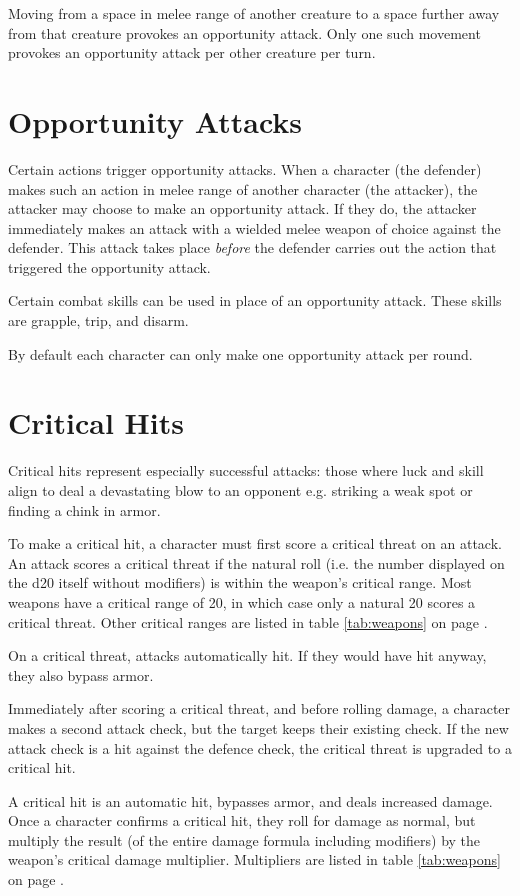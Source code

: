 \begin{multicols*}{2}
    Moving from a space in melee range of another creature to a space further
    away from that creature provokes an opportunity attack. Only one such
    movement provokes an opportunity attack per other creature per turn.

    \section{Opportunity Attacks}\label{combat:opportunity-attacks}
    Certain actions trigger opportunity attacks. When a character (the
    defender) makes such an action in melee range of another character (the
    attacker), the attacker may choose to make an opportunity attack. If they
    do, the attacker immediately makes an attack with a wielded melee weapon
    of choice against the defender. This attack takes place \textit{before}
    the defender carries out the action that triggered the opportunity attack.

    Certain combat skills can be used in place of an opportunity attack. These
    skills are grapple, trip, and disarm.

    By default each character can only make one opportunity attack per round.

    \section{Critical Hits}\label{combat:critical-hits}
    Critical hits represent especially successful attacks: those where luck and
    skill align to deal a devastating blow to an opponent e.g. striking a weak
    spot or finding a chink in armor.

    To make a critical hit, a character must first score a critical
    threat on an attack. An attack scores a critical
    threat if the natural roll (i.e. the number displayed on the d20 itself
    without modifiers) is within the weapon's critical range. Most weapons
    have a critical range of 20, in which case only a natural 20 scores a
    critical threat. Other critical ranges are listed in table
    \ref{tab:weapons} on page \pageref{tab:weapons}.

    On a critical threat, attacks automatically hit. If they would have hit
    anyway, they also bypass armor.

    Immediately after scoring a critical threat, and before rolling damage, a
    character makes a second attack check, but the target keeps their existing
    check. If the new attack check is a hit against the defence check, the
    critical threat is upgraded to a critical hit.

    A critical hit is an automatic hit, bypasses armor, and deals increased
    damage. Once a character confirms a critical hit, they roll for damage
    as normal, but multiply the result (of the entire damage formula including
    modifiers) by the weapon's critical damage multiplier. Multipliers are
    listed in table \ref{tab:weapons} on page \pageref{tab:weapons}.
\end{multicols*}
